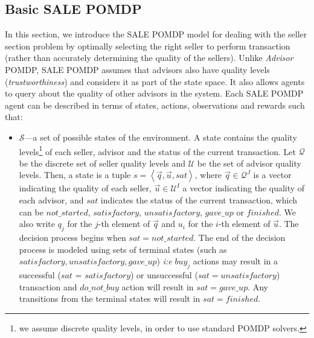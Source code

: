 \documentclass{aamas2014}
\providecommand{\SALEP}{SALE POMDP}
\begin{document}
\subsection{Basic \SALEP{}}
In this section, we introduce the \SALEP{} model for dealing with the seller section problem by optimally selecting the right seller to perform transaction (rather than accurately determining the quality of the sellers). Unlike \textit{Advisor} POMDP, \SALEP{} assumes that advisors also have quality levels (\emph{trustworthiness}) and considers it as part of the state space. It also allows agents to query about the quality of other advisors in the system. Each \SALEP{} agent can be described in terms of states, actions, observations and rewards such that:
\begin{itemize}
\item $\mathcal{S}$---a set of possible states of the environment. A state contains the quality levels\footnote{we assume discrete quality levels, in order to use standard POMDP solvers.} of each seller, advisor and the status of the current transaction. Let $\mathcal{Q}$ be the discrete set of seller quality levels and $\mathcal{U}$ be the set of advisor quality levels. Then, a state is a tuple $s=\left\langle \vec{q},\vec{u},sat\right\rangle $, where $\vec{q}\in\mathcal{Q}^{J}$ is a vector indicating the quality of each seller, $\vec{u}\in\mathcal{U}^{I}$ a vector indicating the quality of each advisor, and $sat$ indicates the status of the current transaction, which can be $not\_started$, $satisfactory$, $unsatisfactory$, $gave\_up$ or $finished$. We also write $q_{j}$ for the $j$-th element of $\vec{q}$ and $u_{i}$ for the $i$-th element of $\vec{u}$. The decision process begins when $sat = not\_started$. The end of the decision process is modeled using sets of terminal states (such as $satisfactory, unsatisfactory, gave\_up$) \textit{i:e} $buy_j$ actions may result in a successful ($sat$ = $satisfactory$) or unsuccessful ($sat = unsatisfactory$) transaction and $do\_not\_buy$ action will result in $sat = gave\_up$. Any transitions from the terminal states will result in $sat = finished$.


\end{itemize}
\end{document}
